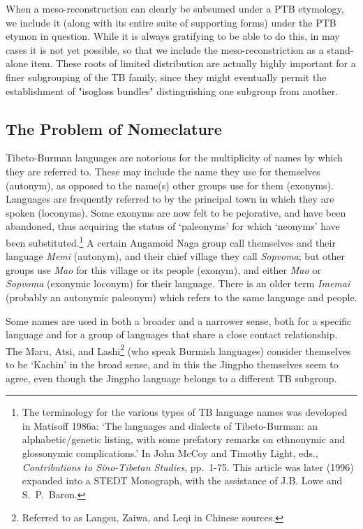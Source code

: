 When a meso-reconstruction can clearly be subsumed under a PTB etymology, we include it (along with its entire suite of supporting forms) under the PTB etymon in question. 
While it is always gratifying to be able to do this, in may cases it is not yet possible, so that we include the meso-reconstriction as a stand-alone item. These roots of limited distribution are actually highly important for a finer subgrouping of the TB family, since they might eventually permit the establishment of "isogloss bundles" distinguishing one subgroup from another.

\subsection{The Problem of Nomeclature}

Tibeto-Burman languages are notorious for the multiplicity of names by which
they are referred to. These may include the name they use for themselves
(autonym), as opposed to the name(s) other groups use for them (exonyms). 
Languages are frequently referred to by the principal town in which they are
spoken (loconyms).  Some exonyms are now felt to be pejorative, and have been
abandoned, thus acquiring the status of ‘paleonyms’ for which ‘neonyms’ have
been substituted.\footnote{The terminology for the various types of TB language
names was developed in Matisoff 1986a: ‘The languages and dialects of
Tibeto-Burman: an alphabetic/genetic listing, with some prefatory remarks on
ethnonymic and glossonymic complications.’  In John McCoy and Timothy Light,
eds., \textit{Contributions to Sino-Tibetan Studies},  pp.~1-75.  This article was later
(1996) expanded into a STEDT Monograph, with the assistance of J.B. Lowe and
S.\ P.\ Baron.}  A certain Angamoid Naga group call themselves and their language
\textit{Memi} (autonym), and their chief village they call \textit{Sopvoma};
but other groups use
\textit{Mao} for this village or its people (exonym), and either \textit{Mao}
or \textit{Sopvoma} (exonymic
loconym) for their language.  There is an older term \textit{Imemai} (probably an
autonymic paleonym) which refers to the same language and people.


Some names are used in both a broader and a narrower sense, both for a
specific language and for a group of languages that share a close contact
relationship.  The Maru, Atsi, and Lashi\footnote{Referred to as Langsu, Zaiwa,
and Leqi in Chinese sources.} (who speak Burmish languages) consider themselves
to be ‘Kachin’ in the broad sense, and in this the Jingpho themselves seem to
agree, even though the Jingpho language belongs to a different TB subgroup.



